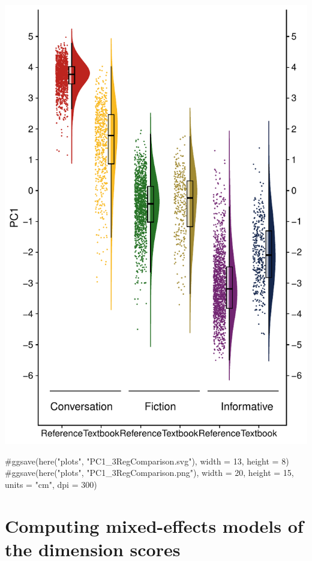 \documentclass[
  letterpaper,
  DIV=11,
  numbers=noendperiod]{scrreprt}
\newenvironment{Shaded}{\begin{snugshade}}{\end{snugshade}}
\newcommand{\CommentTok}[1]{\textcolor[rgb]{0.37,0.37,0.37}{#1}}
\begin{document}
\includegraphics{AppendixH_files/figure-pdf/rainplots-1.pdf}

\begin{Shaded}
\begin{Highlighting}[]
\CommentTok{\#ggsave(here("plots", "PC1\_3RegComparison.svg"), width = 13, height = 8)}
\CommentTok{\#ggsave(here("plots", "PC1\_3RegComparison.png"), width = 20, height = 15, units = "cm", dpi = 300)}
\end{Highlighting}
\end{Shaded}

\section{Computing mixed-effects models of the dimension
scores}\label{computing-mixed-effects-models-of-the-dimension-scores-1}
\end{document}
